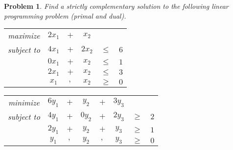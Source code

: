 \documentclass[12pt,oneside]{amsart}
\numberwithin{equation}{section}
\numberwithin{figure}{section}
\theoremstyle{plain}
\newtheorem{prob}{Problem}
\theoremstyle{definition}
\begin{document}
\begin{prob}
Find a strictly complementary solution to the following linear programming 
problem (primal and dual). \\
\begin{center}\begin{tabular}{cccccc}
  maximize   & $2x_1$ & $+$ & $x_2$  &        &     \\
  subject to & $4x_1$ & $+$ & $2x_2$ & $\leq$ & $6$ \\
             & $0x_1$ & $+$ & $x_2$  & $\leq$ & $1$ \\
             & $2x_1$ & $+$ & $x_2$  & $\leq$ & $3$ \\
             & $x_1$  & $,$ & $x_2$  & $\geq$ & $0$ \\
\end{tabular} \quad \begin{tabular}{cccccccc}
  minimize   & $6y_1$ & $+$ & $y_2$  & $+$ & $3y_3$ &        &     \\
  subject to & $4y_1$ & $+$ & $0y_2$ & $+$ & $2y_3$ & $\geq$ & $2$ \\
             & $2y_1$ & $+$ & $y_2$  & $+$ & $y_3$  & $\geq$ & $1$ \\
             & $y_1$  & $,$ & $y_2$  & $,$ & $y_3$  & $\geq$ & $0$ \\
\end{tabular}\end{center}
\end{prob}
\end{document}
